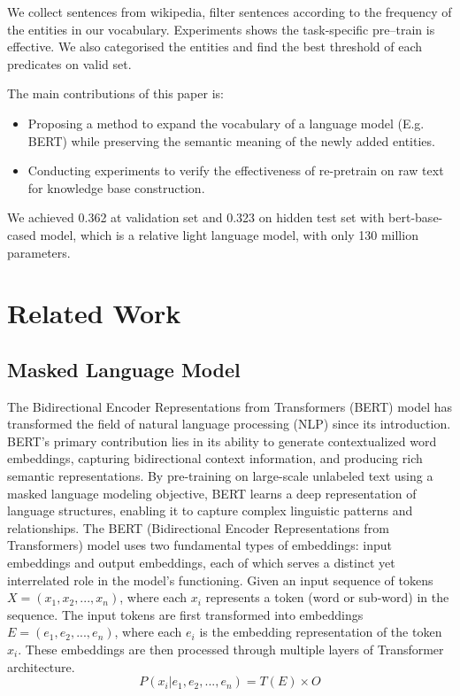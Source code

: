 \documentclass[]{ceurart}
\begin{document}
We collect sentences from wikipedia, filter sentences according to the frequency of the entities in our vocabulary.  Experiments shows the task-specific pre--train is effective.  We also categorised the entities and find the best threshold of each predicates on valid set. 


The main contributions of this paper is:
\begin{itemize}  
\item Proposing a method to expand the vocabulary of a language model (E.g. BERT)  while preserving the semantic meaning of the newly added entities. 
\item Conducting experiments to verify the effectiveness of re-pretrain on raw text for knowledge base construction.
 \end{itemize}

We achieved 0.362 at validation set and 0.323 on hidden test set with bert-base-cased model, which is a relative light language model,  with only 130 million parameters.

\section{Related Work}

\subsection{Masked Language Model}
The Bidirectional Encoder Representations from Transformers (BERT) \cite{devlin_bert_2019} model has transformed the field of natural language processing (NLP) since its introduction. BERT's primary contribution lies in its ability to generate contextualized word embeddings, capturing bidirectional context information, and producing rich semantic representations. By pre-training on large-scale unlabeled text using a masked language modeling objective, BERT learns a deep representation of language structures, enabling it to capture complex linguistic patterns and relationships.  The BERT (Bidirectional Encoder Representations from Transformers) \cite{devlin_bert_2019} model uses two fundamental types of embeddings: input embeddings and output embeddings, each of which serves a distinct yet interrelated role in the model's functioning.  Given an input sequence of tokens $X = (x_1, x_2, ..., x_n)$, where each $x_i$ represents a token (word or sub-word) in the sequence. The input tokens are first transformed into embeddings $E = (e_1, e_2, ..., e_n)$, where each $e_i$ is the embedding representation of the token $x_i$. These embeddings are then processed through multiple layers of Transformer architecture.
\begin{equation}
    P(x_i | e_1, e_2, ..., e_n) = T(E) \times O
\end{equation}
\end{document}
